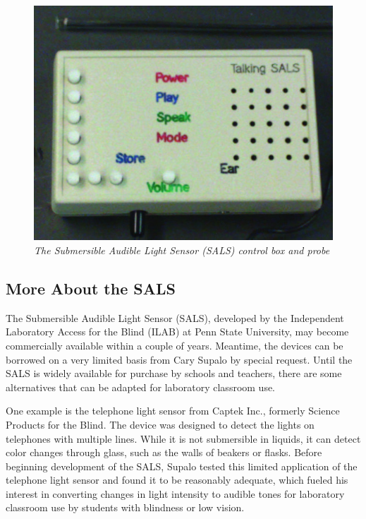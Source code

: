 \documentclass[11.5pt]{sig-alternate} %
\begin{document}
\begin{large}
\begin{figure}[htp]
    \centering
    \captionsetup{font=large, labelfont=it}
    \includegraphics[width=\columnwidth]{Figure 2.jpg}
 \caption{\textit{The Submersible Audible Light Sensor (SALS) control box and probe}}
    \label{Figure 2}
\end{figure}

\subsection*{More About the SALS}
The Submersible Audible Light Sensor (SALS), developed by the Independent Laboratory Access for the Blind (ILAB) at Penn State University, may become commercially available within a couple of years. Meantime, the devices can be borrowed on a very limited basis from Cary Supalo by special request. Until the SALS is widely available for purchase by schools and teachers, there are some alternatives that can be adapted for laboratory classroom use.

One example is the telephone light sensor from Captek Inc., formerly Science Products for the Blind. The device was designed to detect the lights on telephones with multiple lines. While it is not submersible in liquids, it can detect color changes through glass, such as the walls of beakers or flasks. Before beginning development of the SALS, Supalo tested this limited application of the telephone light sensor and found it to be reasonably adequate, which fueled his interest in converting changes in light intensity to audible tones for laboratory classroom use by students with blindness or low vision.


\end{large}
\end{document}
